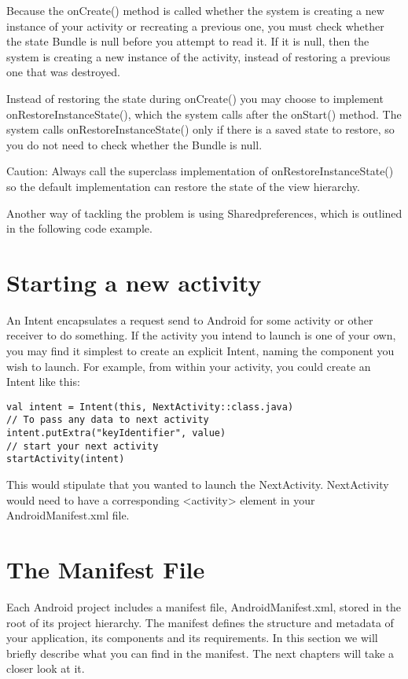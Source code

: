 Because the onCreate() method is called whether the system is creating a new instance of your activity or recreating a previous one, you must check whether the state Bundle is null before you attempt to read it.
If it is null, then the system is creating a new instance of the activity, instead of restoring a previous one that was destroyed.

Instead of restoring the state during onCreate() you may choose to implement onRestoreInstanceState(), which the system calls after the onStart() method.
The system calls onRestoreInstanceState() only if there is a saved state to restore, so you do not need to check whether the Bundle is null.

Caution: Always call the superclass implementation of onRestoreInstanceState() so the default implementation can restore the state of the view hierarchy.

Another way of tackling the problem is using Sharedpreferences, which is outlined in the following code example.





\section{Starting a new activity}
An Intent encapsulates a request send to Android for some activity or other receiver to do something.
If the activity you intend to launch is one of your own, you may find it simplest to create an explicit Intent, naming the component you wish to launch.
For example, from within your activity, you could create an Intent like this:

\begin{lstlisting}
val intent = Intent(this, NextActivity::class.java)
// To pass any data to next activity
intent.putExtra("keyIdentifier", value)
// start your next activity
startActivity(intent)
\end{lstlisting}

This would stipulate that you wanted to launch the NextActivity.
NextActivity would need to have a corresponding <activity> element in your AndroidManifest.xml file.

\section{The Manifest File}
Each Android project includes a manifest file, AndroidManifest.xml, stored in the root of its project hierarchy.
The manifest defines the structure and metadata of your application, its components and its requirements.
In this section we will briefly describe what you can find in the manifest.
The next chapters will take a closer look at it.

